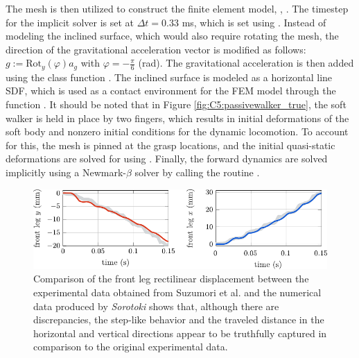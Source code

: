 



The mesh is then utilized to construct the finite element model, \ie, . The timestep for the implicit solver is set at $\Delta t = 0.33$ \si{\milli \second}, which is set using . Instead of modeling the inclined surface, which would also require rotating the mesh, the direction of the gravitational acceleration vector is modified as follows: $g := \textrm{Rot}_y(\varphi) a_g$ with $\varphi = -\frac{\pi}{6}$ (rad). The gravitational acceleration is then added using the class function . The inclined surface is modeled as a horizontal line SDF, which is used as a contact environment for the FEM model through the function . It should be noted that in Figure \ref{fig:C5:passivewalker_true}, the soft walker is held in place by two fingers, which results in initial deformations of the soft body and nonzero initial conditions for the dynamic locomotion. To account for this, the mesh is pinned at the grasp locations, and the initial quasi-static deformations are solved for using . Finally, the forward dynamics are solved implicitly using a Newmark-$\beta$ solver by calling the routine .

%
\begin{figure}[!t]
    \centering
    \includegraphics*[width=.99\textwidth]{./pdf/thesis-figure-6-19-1.pdf}
    \caption{Comparison of the front leg rectilinear displacement between the experimental data obtained from Suzumori et al. \cite{Suzumori2008Sep} and the numerical data produced by \textit{Sorotoki} shows that, although there are discrepancies, the step-like behavior and the traveled distance in the horizontal and vertical directions appear to be truthfully captured in comparison to the original experimental data. }
    \label{fig:C5:passivewalker_compare}
\end{figure}
%

